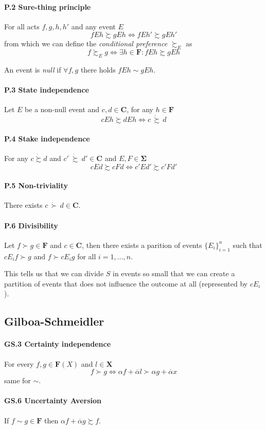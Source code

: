 \documentclass[landscape, 12pt]{extarticle}
\newcommand{\dsuccsim}{\ \dot \succsim \ }
\begin{document}
\begin{multicols}{2}
	\paragraph{P.2 Sure-thing principle}
	For all acts $f, g, h, h'$ and any event $E$
	\[
		fEh \succsim gEh \iff fEh' \succsim gEh'
	\]
	from which we can define the \textit{conditional preference} $\succsim_E$ as
	\[
		f \succsim_E g \iff \exists h \in \bm F : f E h \succsim gEh
	\]

	An event is \textit{null} if $\forall f, g$ there holds $fEh \sim gEh$.

	\paragraph{P.3 State independence}
	Let $E$ be a non-null event and $c, d \in \bm C$, for any $h \in \bm F$
	\[
		cEh \succsim dEh \iff c\, \dot \succsim \, d
	\]

	\paragraph{P.4 Stake independence}
	For any $c \dot \succsim d$ and $c' \dsuccsim d' \in \bm C$
	and $E, F \in \bm \Sigma$
	\[
		cEd \succsim cFd \iff c'Ed'\succsim c'Fd'
	\]

	\paragraph{P.5 Non-triviality}
	There exists $c \, \dot \succ \, d \in \bm C$.

	\paragraph{P.6 Divisibility}
	Let $f \succ g \in \bm F$ and $c \in \bm C$,
	then there exists a parition of events $\{E_i\}^n_{i=1}$
	such that $cE_if \succ g$ and $f \succ cE_ig$ for all $i=1,\dots,n$.

	This tells us that we can divide $S$ in events so small that we can create
	a partition of events that does not influence the outcome at all (represented by $cE_i$).

	\subsection{Gilboa-Schmeidler}
	\paragraph{GS.3 Certainty independence}
	For every $f, g \in \bm F(X)$ and $l \in \bm X$
	\[
		f \succ g \iff \alpha f + \overline \alpha l \succ \alpha g + \overline \alpha x
	\]
	same for $\sim$.

	\paragraph{GS.6 Uncertainty Aversion}
	If $f \sim g \in \bm F$ then $\alpha f + \overline \alpha g \succsim f$.

\end{multicols}
\end{document}
